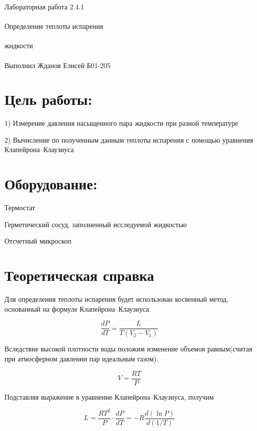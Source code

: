 \documentclass{astroedu-lab}
\begin{document}
\pagestyle{plain}

\begin{problem}{\huge Лабораторная работа 2.4.1\\\\Определение теплоты испарения\\\\жидкости\\\\Выполнил Жданов Елисей Б01-205}

\section{Цель работы:}

1) Измерение давления насыщенного пара жидкости при разной температуре

2) Вычисление по полученным данным теплоты испарения с помощью уравнения Клапейрона–Клаузиуса

\section{Оборудование:}

Термостат

Герметический сосуд, заполненный исследуемой жидкостью

Отсчетный микроскоп

\section{Теоретическая справка}

Для определения теплоты испарения будет использован косвенный метод, основанный на формуле Клапейрона–Клаузиуса.

\begin{equation}
	\frac{d P}{d T}=\frac{L}{T\left(V_2-V_1\right)}
\end{equation}

Вследствие высокой плотности воды положим изменение объемов равным(считая при атмосферном давлении пар идеальным газом).

\begin{equation}
	V=\frac{R T}{P}
\end{equation}

Подставляя выражение в уравнение Клапейрона–Клаузиуса, получим

\begin{equation}
	L=\frac{R T^2}{P} \cdot \frac{d P}{d T}=-R \frac{d(\ln P)}{d(1 / T)}
\end{equation}


\end{problem}
\end{document}
